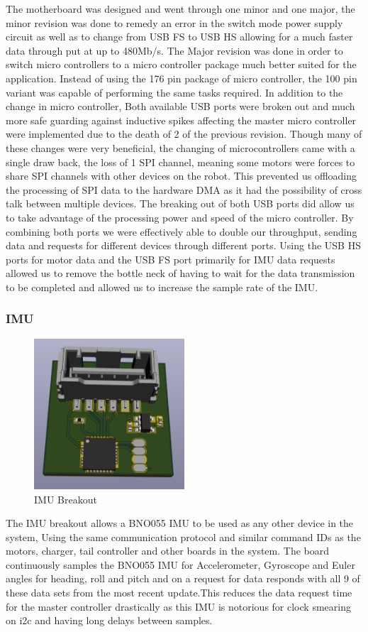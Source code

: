    The motherboard was designed and went through one minor and one major, the minor revision was done to remedy an error in the switch mode power supply circuit as well as to change from USB FS to USB HS allowing for a much faster data  through put at up to 480Mb/s.
 	The Major revision was done in order to switch micro controllers to a micro controller package much better suited for the application. Instead of using the 176 pin package of micro controller, the 100 pin variant was capable of performing the same tasks required. In addition to the change in micro controller, Both available USB ports were broken out and much more safe guarding against inductive spikes affecting the master micro controller were implemented due to the death of 2 of the previous revision. Though many of these changes were very beneficial, the changing of microcontrollers came with a single draw back, the loss of 1 SPI channel, meaning some motors were forces to share SPI channels with other devices on the robot. This prevented us offloading the processing of SPI data to the hardware DMA as it had the possibility of cross talk between multiple devices. The breaking out of both USB ports did allow us to take advantage of the processing power and speed of the micro controller. By combining both ports we were effectively able to double our throughput, sending data and requests for different devices through different ports. Using the USB HS ports for motor data and the USB FS port primarily for IMU data requests allowed us to remove the bottle neck of having to wait for the data transmission to be completed and allowed us to increase the sample rate of the IMU.
\subsubsection{IMU}
\begin{figure}[H]
       \centering
       \includegraphics[width=0.5\textwidth]{figures/IMU.png}
       \caption{IMU Breakout}
       \label{fig:IMUPCB}
   \end{figure}
   The IMU breakout allows a BNO055 IMU to be used as any other device in the system, Using the same communication protocol and similar command IDs as the motors, charger, tail controller and other boards in the system. The board continuously samples the BNO055 IMU for Accelerometer, Gyroscope and Euler angles for heading, roll and pitch and on a request for data responds with all 9 of these data sets from the most recent update.This reduces the data request time for the master controller drastically as this IMU is notorious for clock smearing on i2c and having long delays between samples.
   
